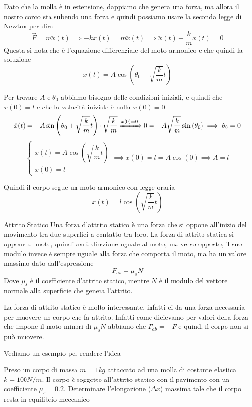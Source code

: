 \documentclass{rapport}
\begin{document}
Dato che la molla è in estensione, dappiamo che genera una forza, ma allora il nostro corco sta subendo una forza e quindi possiamo usare la seconda legge di Newton per dire 
\[
\vec{F} = m\ddot{x}(t) \implies -kx(t) = m\ddot{x}(t) \implies \ddot{x}(t) + \dfrac{k}{m}x(t) = 0 
\]
 Questa si nota che è l'equazione differenziale del moto armonico e che quindi la soluzione 
 \[
 x(t) = A\cos\left(\theta_0 + \sqrt{\dfrac{k}{m}}t\right)
 \]

 Per trovare $A$ e $\theta_0$ abbiamo bisogno delle condizioni iniziali, e quindi che $x(0) = l$ e che la volocità iniziale è nulla $\dot{x}(0) = 0$
 \[
 \dot{x}(t) = -A\sin\left(\theta_0 + \sqrt{\dfrac{k}{m}}t\right) \cdot \sqrt{\dfrac{k}{m}} \xRightarrow{\dot{x}(0) = 0}  0 = -A\sqrt{\dfrac{k}{m}} \sin\left(\theta_0 \right) \implies \theta_0= 0 
 \]
 \[
 \begin{cases}
   x(t) = A\cos\left( \sqrt{\dfrac{k}{m}}t\right) \\
   x(0) = l 
 \end{cases} \implies x(0) = l = A\cos(0) \implies A = l
 \]

 Quindi il corpo segue un moto armonico con legge oraria 
 \[
 x(t) = l\cos\left(\sqrt{\dfrac{k}{m}}t\right)
 \]

 \newpage
 \begin{definizione}{Attrito Statico}{}
    Una forza d'attrito statico è una forza che si oppone all'inizio del movimento tra due superfici a contatto tra loro. La forza di attrito statica si oppone al moto, quindi avrà direzione uguale al moto, ma verso opposto, il suo modulo invece è sempre uguale alla forza che comporta il moto, ma ha un valore massimo dato dall'espressione 
    \[
    F_{as} = \mu_s N 
    \] 
    Dove $\mu_s$ è il coefficiente d'attrito statico, mentre $N$ è il modulo del vettore normale alla superficie che genera l'attrito.
 \end{definizione}

 La forza di attrito statico è molto interessante, infatti ci da una forza necessaria per muovere un corpo che fa attrito. Infatti come dicievamo per valori della forza che impone il moto minori di $\mu_s N$ abbiamo che $F_{ab} = -F$ e quindi il corpo non si può muovere.
 
 Vediamo un esempio per rendere l'idea 

 \begin{esercizio}{}{}
   Preso un corpo di massa $m=1kg$ attaccato ad una molla di costante elastica $k=100N/m$. Il corpo è soggetto all'attrito statico con il pavimento con un coefficiente $\mu_s = 0.2$. Determinare l'elongazione ($\Delta x$) massima tale che il corpo resta in equilibrio meccanico
 \end{esercizio}
\end{document}
